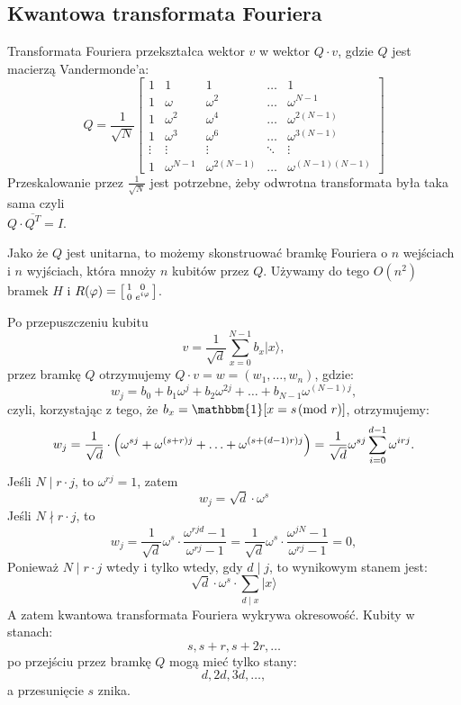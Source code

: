 \subsection*{Kwantowa transformata Fouriera}
Transformata Fouriera przekształca wektor \( v \) w wektor \( Q \cdot v \), gdzie \( Q \) jest macierzą Vandermonde'a:
\[
	Q = \frac{1}{\sqrt{N}} \begin{bmatrix}
		1      & 1            & 1               & \ldots & 1                   \\
		1      & \omega       & \omega^2        & \ldots & \omega^{N-1}        \\
		1      & \omega^2     & \omega^4        & \ldots & \omega^{2(N-1)}     \\
		1      & \omega^3     & \omega^6        & \ldots & \omega^{3(N-1)}     \\
		\vdots & \vdots       & \vdots          & \ddots & \vdots              \\
		1      & \omega^{N-1} & \omega^{2(N-1)} & \ldots & \omega^{(N-1)(N-1)}
	\end{bmatrix}
\]
Przeskalowanie przez \( \frac{1}{\sqrt{N}} \) jest potrzebne, żeby odwrotna transformata była taka sama czyli \\ \( Q \cdot \overline{Q^T} = I \).

Jako że \( Q \) jest unitarna, to możemy skonstruować bramkę Fouriera o \( n \) wejściach i \( n \) wyjściach, która mnoży \( n \) kubitów przez \( Q \).
Używamy do tego \( O(n^2) \) bramek \( H \) i \( R(\varphi) =
\left[\begin{smallmatrix}
		1 & 0 \\
		0 & e^{i\varphi}
	\end{smallmatrix}\right]
\).

Po przepuszczeniu kubitu
\[
	v = \frac{1}{\sqrt{d}} \sum_{x=0}^{N-1} b_x |x\rangle,
\]
przez bramkę \( Q \) otrzymujemy \( Q \cdot v = w = (w_1, \ldots, w_n) \), gdzie:
\[
	w_j = b_0 + b_1 \omega^j + b_2 \omega^{2j} + \ldots + b_{N-1} \omega^{(N-1)j},
\]
czyli, korzystając z tego, że \( b_x = \mathbbm{1}[x = s \!\!\pmod{r}] \), otrzymujemy:
\[
	w_j = \frac{1}{\sqrt{d}} \cdot \left( \omega^{s j} + \omega^{(s + r) j} + \ldots + \omega^{(s + (d - 1)r) j} \right) = \frac{1}{\sqrt{d}} \omega^{s j} \sum_{i = 0}^{d - 1} \omega^{i r j}.
\]
Jeśli \( N \mid r \cdot j \), to \( \omega^{r j} = 1 \), zatem
\[
	w_j = \sqrt{d} \cdot \omega^{s}
\]
Jeśli \( N \nmid r \cdot j \), to
\[
	w_j = \frac{1}{\sqrt{d}} \omega^{s} \cdot \frac{\omega^{r j d} - 1}{\omega^{r j} - 1} = \frac{1}{\sqrt{d}} \omega^{s} \cdot \frac{\omega^{j N} - 1}{\omega^{r j} - 1} = 0,
\]
Ponieważ \( N \mid r \cdot j \) wtedy i tylko wtedy, gdy \( d \mid j \), to wynikowym stanem jest:
\[
	\sqrt{d} \cdot \omega^s \cdot \sum_{d \mid x} |x\rangle
\]
A zatem kwantowa transformata Fouriera wykrywa okresowość.
Kubity w stanach: \[ s, s + r, s + 2r, \ldots \] po przejściu przez bramkę \( Q \) mogą mieć tylko stany: \[ d, 2d, 3d, \ldots, \] a przesunięcie \( s \) znika.

